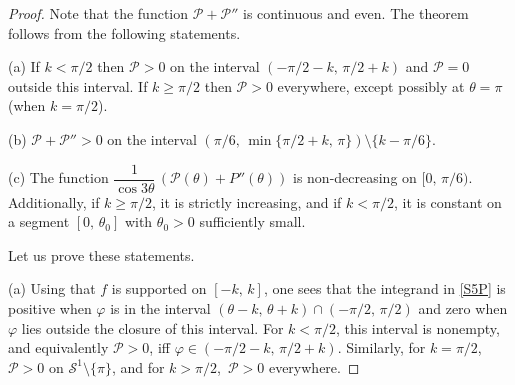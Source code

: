 \documentclass[a4paper,12pt]{article}
\newcommand {\PPP}{\mathcal{P}}
\newcommand {\SSS}{\mathcal{S}^1}
\theoremstyle{remark}
\theoremstyle{definition}
\begin{document}
\begin{proof}
Note that the function $\PPP+\PPP''$ is continuous and even. The theorem follows from the following statements.
\vspace{2mm}

(a) If $k < \pi/2$ then $\PPP>0$ on the interval $(-\pi/2-k,\, \pi/2+k)$ and $\PPP=0$ outside this interval. If $k \ge \pi/2$ then $\PPP>0$ everywhere, except possibly at $\theta=\pi$ (when $k=\pi/2$).
\vspace{2mm}

(b) $\PPP + \PPP'' > 0$ on the interval $(\pi/6,\, \min\{\pi/2 + k,\, \pi \}) \setminus \{ k-\pi/6 \}$.
\vspace{2mm}

(c) The function $\dfrac{1}{\cos 3\theta}\,(\PPP(\theta) + P''(\theta))$ is non-decreasing on $[0,\, \pi/6)$. Additionally, if $k \ge \pi/2$, it is strictly increasing, and if $k < \pi/2$, it is constant on a segment $[0,\, \theta_0]$ with $\theta_0>0$ sufficiently small.
\vspace{2mm}

Let us prove these statements.\vspace{2mm}

(a) Using that $f$ is supported on $[-k,\, k]$, one sees that the integrand in \eqref{S5P} is positive when $\varphi$ is in the interval $(\theta-k,\, \theta+k) \cap (-\pi/2,\, \pi/2)$ and zero when $\varphi$ lies outside the closure of this interval. For $k < \pi/2$, this interval is nonempty, and equivalently $\PPP>0$, iff $\varphi \in (-\pi/2-k,\, \pi/2+k)$. Similarly, for $k=\pi/2$,\, $\PPP>0$ on $\SSS \setminus \{ \pi \}$, and for $k> \pi/2$,\, $\PPP>0$ everywhere.
\vspace{2mm}


\end{proof}
\end{document}
